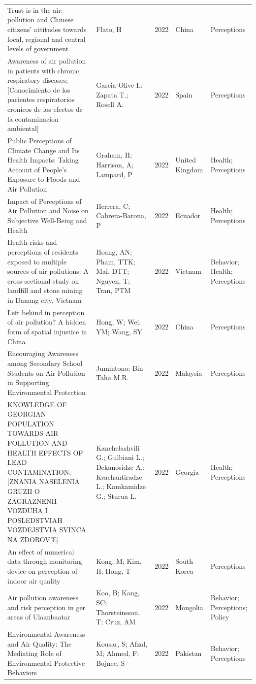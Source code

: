 {\begin{longtable}[t]{p{6cm}p{3cm}lp{3cm}p{3cm}}
Trust is in the air: pollution and Chinese citizens' attitudes towards local, regional and central levels of government & Flato, H & 2022 & China & Perceptions\\
\addlinespace
Awareness of air pollution in patients with chronic respiratory diseases; [Conocimiento de los pacientes respiratorios cronicos de los efectos de la contaminacion ambiental] & Garcia-Olive I.; Zapata T.; Rosell A. & 2022 & Spain & Perceptions\\
Public Perceptions of Climate Change and Its Health Impacts: Taking Account of People's Exposure to Floods and Air Pollution & Graham, H; Harrison, A; Lampard, P & 2022 & United Kingdom & Health; Perceptions\\
Impact of Perceptions of Air Pollution and Noise on Subjective Well-Being and Health & Herrera, C; Cabrera-Barona, P & 2022 & Ecuador & Health; Perceptions\\
Health risks and perceptions of residents exposed to multiple sources of air pollutions: A cross-sectional study on landfill and stone mining in Danang city, Vietnam & Hoang, AN; Pham, TTK; Mai, DTT; Nguyen, T; Tran, PTM & 2022 & Vietnam & Behavior; Health; Perceptions\\
Left behind in perception of air pollution? A hidden form of spatial injustice in China & Hong, W; Wei, YM; Wang, SY & 2022 & China & Perceptions\\
\addlinespace
Encouraging Awareness among Secondary School Students on Air Pollution in Supporting Environmental Protection & Jumintono; Bin Taha M.R. & 2022 & Malaysia & Perceptions\\
KNOWLEDGE OF GEORGIAN POPULATION TOWARDS AIR POLLUTION AND HEALTH EFFECTS OF LEAD CONTAMINATION; [ZNANIA NASELENIA GRUZII O ZAGRAZNENII VOZDUHA I POSLEDSTVIAH VOZDEJSTVIA SVINCA NA ZDOROV'E] & Kanchelashvili G.; Gulbiani L.; Dekanosidze A.; Kvachantiradze L.; Kamkamidze G.; Sturua L. & 2022 & Georgia & Health; Perceptions\\
An effect of numerical data through monitoring device on perception of indoor air quality & Kong, M; Kim, H; Hong, T & 2022 & South Korea & Perceptions\\
Air pollution awareness and risk perception in ger areas of Ulaanbaatar & Koo, B; Kang, SC; Thorsteinsson, T; Cruz, AM & 2022 & Mongolia & Behavior; Perceptions; Policy\\
Environmental Awareness and Air Quality: The Mediating Role of Environmental Protective Behaviors & Kousar, S; Afzal, M; Ahmed, F; Bojnec, S & 2022 & Pakistan & Behavior; Perceptions\\

\end{longtable}}
